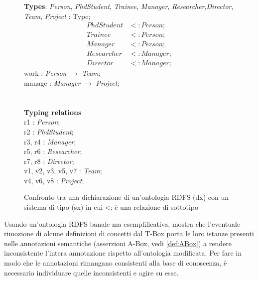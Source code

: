 \begin{figure}
\begin{minipage}[t]{0.45\textwidth}
			\textbf{Types}: \textit{Person}, \textit{PhdStudent}, \textit{Trainee}, \textit{Manager}, \textit{Researcher},\textit{Director}, \textit{Team}, \textit{Project} : Type;
			\begin{align}
			PhdStudent &<: Person;\\
			Trainee &<: Person;\\
			Manager &<: Person;\\
			Researcher &<: Manager;\\
			Director &<: Manager;
		\end{align}
			work : \textit{Person} $\to$ \textit{Team};\\
			manage : \textit{Manager} $\to$ \textit{Project};\\\\\\
			\textbf{Typing relations}\\
			r1 : \textit{Person};\\
			r2 : \textit{PhdStudent};\\
			r3, r4 : \textit{Manager};\\
			r5, r6 : \textit{Researcher};\\
			r7, r8 : \textit{Director};\\
			v1, v2, v3, v5, v7 : \textit{Team};\\
			v4, v6, v8 : \textit{Project};\\
	\end{minipage}
	\captionsetup{justification=Centering}
	\caption{Confronto tra una dichiarazione di un'ontologia RDFS (dx) con un sistema di tipo (sx) in cui <: è una relazione di sottotipo}
	\label{fig:confrontotypesystem}
\end{figure}
\noindent
Usando un'ontologia RDFS banale ma esemplificativa, \cite{despeyroux2008evolution} mostra che l'eventuale rimozione di  alcune definizioni di concetti dal T-Box porta le loro istanze presenti nelle annotazioni semantiche (asserzioni A-Box, vedi \autoref{def:ABox}) a rendere inconsistente l'intera annotazione rispetto all'ontologia modificata. Per fare in modo che le annotazioni rimangano consistenti alla base di conoscenza, è necessario individuare quelle inconsistenti e agire su esse.
